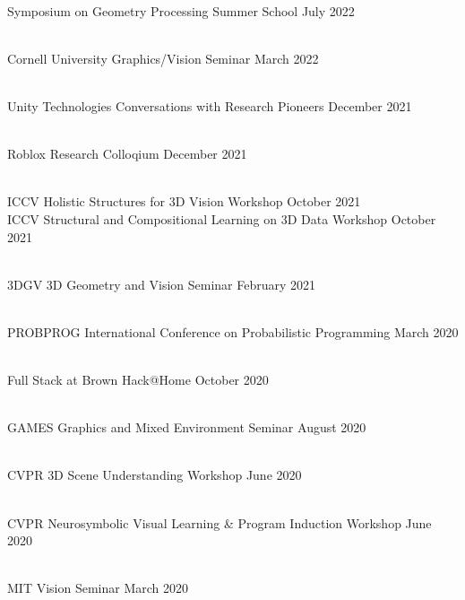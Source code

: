 \documentclass[line,margin]{res}
\begin{document}
\begin{resume}
\\
\talk
	{Symposium on Geometry Processing}
	{Summer School}
	{July 2022}

\\
\talk
	{Cornell University}
	{Graphics/Vision Seminar}
	{March 2022}

\\
\talk
	{Unity Technologies}
	{Conversations with Research Pioneers}
	{December 2021}

\\
\talk
	{Roblox}
	{Research Colloqium}
	{December 2021}

\\
\talk
	{ICCV}
	{Holistic Structures for 3D Vision Workshop}
	{October 2021}
\\
\talk
	{ICCV}
	{Structural and Compositional Learning on 3D Data Workshop}
	{October 2021}

\\
\talk
	{3DGV}
	{3D Geometry and Vision Seminar}
	{February 2021}

\\
\talk
	{PROBPROG}
	{International Conference on Probabilistic Programming}
	{March 2020}

\\
\talk
	{Full Stack at Brown}
	{Hack@Home}
	{October 2020}

\\
\talk
	{GAMES}
	{Graphics and Mixed Environment Seminar}
	{August 2020}

\\
\talk
	{CVPR}
	{3D Scene Understanding Workshop}
	{June 2020}

\\
\talk
	{CVPR}
	{Neurosymbolic Visual Learning \& Program Induction Workshop}
	{June 2020}

\\
\talk
	{MIT}
	{Vision Seminar}
	{March 2020}


\end{resume}
\end{document}
